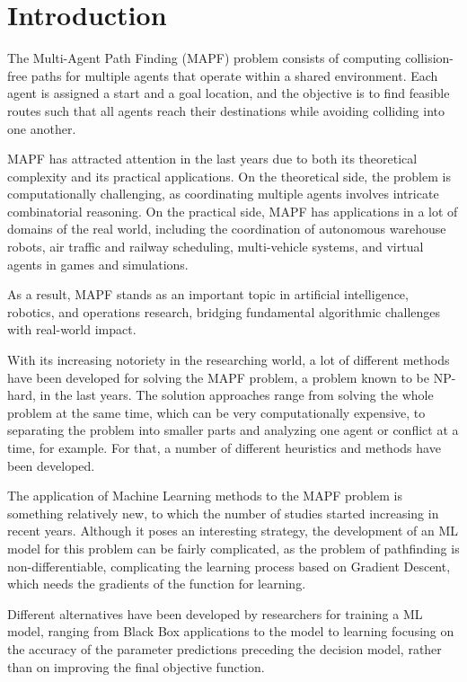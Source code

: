 \section{Introduction}

The Multi-Agent Path Finding (MAPF) problem consists of computing collision-free paths for multiple agents that operate within a shared environment. Each agent is assigned a start and a goal location, and the objective is to find feasible routes such that all agents reach their destinations while avoiding colliding into one another.

MAPF has attracted attention in the last years due to both its theoretical complexity and its practical applications. On the theoretical side, the problem is computationally challenging, as coordinating multiple agents involves intricate combinatorial reasoning. On the practical side, MAPF has applications in a lot of domains of the real world, including the coordination of autonomous warehouse robots, air traffic and railway scheduling, multi-vehicle systems, and virtual agents in games and simulations.

As a result, MAPF stands as an important topic in artificial intelligence, robotics, and operations research, bridging fundamental algorithmic challenges with real-world impact.

With its increasing notoriety in the researching world, a lot of different methods have been developed for solving the MAPF problem, a problem known to be NP-hard, in the last years. The solution approaches range from solving the whole problem at the same time, which can be very computationally expensive, to separating the problem into smaller parts and analyzing one agent or conflict at a time, for example. For that, a number of different heuristics and methods have been developed.

The application of Machine Learning methods to the MAPF problem is something relatively new, to which the number of studies started increasing in recent years. Although it poses an interesting strategy, the development of an ML model for this problem can be fairly complicated, as the problem of pathfinding is non-differentiable, complicating the learning process based on Gradient Descent, which needs the gradients of the function for learning.

Different alternatives have been developed by researchers for training a ML model, ranging from Black Box applications to the model to learning focusing on the accuracy of the parameter predictions preceding the decision model, rather than on improving the final objective function.

